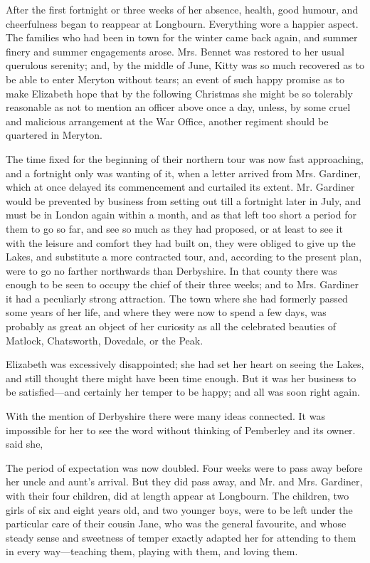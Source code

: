 After the first fortnight or three weeks of her absence, health, good humour, and cheerfulness began to reappear at Longbourn. Everything wore a happier aspect. The families who had been in town for the winter came back again, and summer finery and summer engagements arose. Mrs. Bennet was restored to her usual querulous serenity; and, by the middle of June, Kitty was so much recovered as to be able to enter Meryton without tears; an event of such happy promise as to make Elizabeth hope that by the following Christmas she might be so tolerably reasonable as not to mention an officer above once a day, unless, by some cruel and malicious arrangement at the War Office, another regiment should be quartered in Meryton.

The time fixed for the beginning of their northern tour was now fast approaching, and a fortnight only was wanting of it, when a letter arrived from Mrs. Gardiner, which at once delayed its commencement and curtailed its extent. Mr. Gardiner would be prevented by business from setting out till a fortnight later in July, and must be in London again within a month, and as that left too short a period for them to go so far, and see so much as they had proposed, or at least to see it with the leisure and comfort they had built on, they were obliged to give up the Lakes, and substitute a more contracted tour, and, according to the present plan, were to go no farther northwards than Derbyshire. In that county there was enough to be seen to occupy the chief of their three weeks; and to Mrs. Gardiner it had a peculiarly strong attraction. The town where she had formerly passed some years of her life, and where they were now to spend a few days, was probably as great an object of her curiosity as all the celebrated beauties of Matlock, Chatsworth, Dovedale, or the Peak.

Elizabeth was excessively disappointed; she had set her heart on seeing the Lakes, and still thought there might have been time enough. But it was her business to be satisfied---and certainly her temper to be happy; and all was soon right again.

With the mention of Derbyshire there were many ideas connected. It was impossible for her to see the word without thinking of Pemberley and its owner.  said she, 

The period of expectation was now doubled. Four weeks were to pass away before her uncle and aunt's arrival. But they did pass away, and Mr. and Mrs. Gardiner, with their four children, did at length appear at Longbourn. The children, two girls of six and eight years old, and two younger boys, were to be left under the particular care of their cousin Jane, who was the general favourite, and whose steady sense and sweetness of temper exactly adapted her for attending to them in every way---teaching them, playing with them, and loving them.

